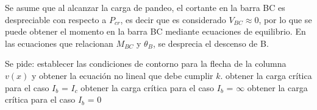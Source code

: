 Se asume que al alcanzar la carga de pandeo, el cortante en la barra BC es despreciable con respecto a $P_{cr}$, es decir que es considerado $V_{BC} \approx 0$, por lo que se puede obtener el momento en la barra BC mediante ecuaciones de equilibrio. En las ecuaciones que  relacionan $M_{BC}$ y $\theta_B$, se desprecia el descenso de B. 

Se pide:
\parte establecer las condiciones de contorno para la flecha de la columna $v(x)$ y obtener la ecuación no lineal que debe cumplir $k$.
\parte obtener la carga crítica para el caso $I_b$ = $I_c$ 
\parte obtener la carga crítica para el caso $I_b$ = $\infty$
\parte obtener la carga crítica para el caso $I_b$ = 0
